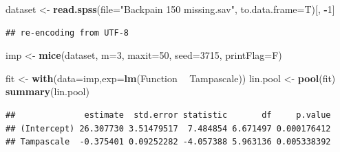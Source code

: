 \documentclass[]{book}
\newenvironment{Shaded}{\begin{snugshade}}{\end{snugshade}}
\newcommand{\KeywordTok}[1]{\textcolor[rgb]{0.13,0.29,0.53}{\textbf{#1}}}
\newcommand{\DataTypeTok}[1]{\textcolor[rgb]{0.13,0.29,0.53}{#1}}
\newcommand{\DecValTok}[1]{\textcolor[rgb]{0.00,0.00,0.81}{#1}}
\newcommand{\StringTok}[1]{\textcolor[rgb]{0.31,0.60,0.02}{#1}}
\newcommand{\CommentTok}[1]{\textcolor[rgb]{0.56,0.35,0.01}{\textit{#1}}}
\newcommand{\OperatorTok}[1]{\textcolor[rgb]{0.81,0.36,0.00}{\textbf{#1}}}
\newcommand{\NormalTok}[1]{#1}
\theoremstyle{definition}
\theoremstyle{definition}
\theoremstyle{definition}
\theoremstyle{remark}
\begin{document}
\begin{Shaded}
\begin{Highlighting}[]
\NormalTok{dataset <-}\StringTok{ }\KeywordTok{read.spss}\NormalTok{(}\DataTypeTok{file=}\StringTok{"Backpain 150 missing.sav"}\NormalTok{, }\DataTypeTok{to.data.frame=}\NormalTok{T)[, }\OperatorTok{-}\DecValTok{1}\NormalTok{]}
\end{Highlighting}
\end{Shaded}

\begin{verbatim}
## re-encoding from UTF-8
\end{verbatim}

\begin{Shaded}
\begin{Highlighting}[]
\NormalTok{imp <-}\StringTok{ }\KeywordTok{mice}\NormalTok{(dataset, }\DataTypeTok{m=}\DecValTok{3}\NormalTok{, }\DataTypeTok{maxit=}\DecValTok{50}\NormalTok{, }\DataTypeTok{seed=}\DecValTok{3715}\NormalTok{, }\DataTypeTok{printFlag=}\NormalTok{F)}

\NormalTok{fit <-}\StringTok{ }\KeywordTok{with}\NormalTok{(}\DataTypeTok{data=}\NormalTok{imp,}\DataTypeTok{exp=}\KeywordTok{lm}\NormalTok{(Function }\OperatorTok{~}\StringTok{ }\NormalTok{Tampascale))}
\NormalTok{lin.pool <-}\StringTok{ }\KeywordTok{pool}\NormalTok{(fit)}
\KeywordTok{summary}\NormalTok{(lin.pool)}
\end{Highlighting}
\end{Shaded}

\begin{verbatim}
##              estimate  std.error statistic       df     p.value
## (Intercept) 26.307730 3.51479517  7.484854 6.671497 0.000176412
## Tampascale  -0.375401 0.09252282 -4.057388 5.963136 0.005338392
\end{verbatim}

\begin{Shaded}
\end{Shaded}
\end{document}

